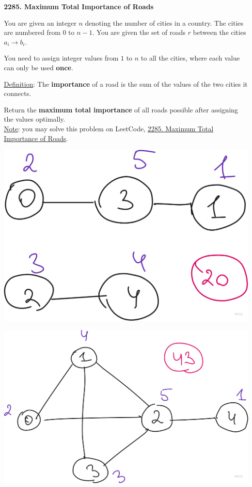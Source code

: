 \begin{problem}\textbf{2285. Maximum Total Importance of Roads}

    You are given an integer $n$ denoting the number of cities in a country. The cities are numbered from $0$ to $n-1$. You are given the set of roads $r$ between the cities $a_i \to b_i$.

    You need to assign integer values from $1$ to $n$ to all the cities, where each value can only be used \textbf{once}.

    \underline{Definition}: The \textbf{importance} of a road is the sum of the values of the two cities it connects.

    Return the \textbf{maximum total importance} of all roads possible after assigning the values optimally.\\

    \underline{Note}: you may solve this problem on LeetCode, \href{https://leetcode.com/problems/maximum-total-importance-of-roads/description/}{2285. Maximum Total Importance of Roads}.

    \begin{center}
        \includegraphics[scale=0.11]{./assets/14-graphs-and-basic-dfs/1.png}

        \includegraphics[scale=0.11]{./assets/14-graphs-and-basic-dfs/2.png}
    \end{center}

\end{problem}


